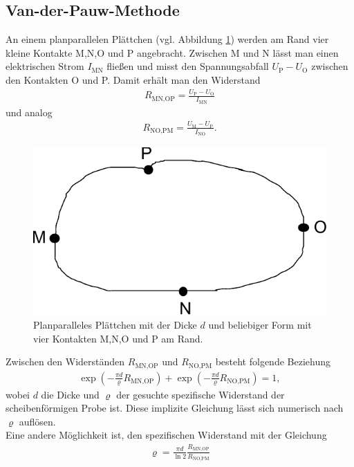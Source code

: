 \documentclass[a4paper,12pt]{article}
\begin{document}
\subsection{Van-der-Pauw-Methode}
An einem planparallelen Plättchen (vgl. Abbildung \ref{fig:vdP}) werden am Rand vier kleine Kontakte M,N,O und P angebracht. Zwischen M und N lässt man einen elektrischen Strom $I_\text{MN}$ fließen und misst den Spannungsabfall $U_\text{P}-U_\text{O}$ zwischen den Kontakten O und P. Damit erhält man den Widerstand
\begin{align}
R_\text{MN,OP}=\frac{U_\text{P}-U_\text{O}}{I_\text{MN}}
\end{align}
und analog
\begin{align}
R_\text{NO,PM}=\frac{U_\text{M}-U_\text{P}}{I_\text{NO}}.
\end{align}
\begin{figure}[h]
\centering
\includegraphics[scale=1]{arbitrary_plate.pdf}
\caption{Planparalleles Plättchen mit der Dicke $d$ und beliebiger Form mit vier Kontakten M,N,O und P am Rand.}
\label{fig:vdP}
\end{figure}
Zwischen den Widerständen $R_\text{MN,OP}$ und $R_\text{NO,PM}$ besteht folgende Beziehung
\begin{align}
\exp\left(-\frac{\pi d}{\varrho}R_\text{MN,OP}\right)+\exp\left(-\frac{\pi d}{\varrho}R_\text{NO,PM}\right)=1,
\end{align}
wobei $d$ die Dicke und $\varrho$ der gesuchte spezifische Widerstand der scheibenförmigen Probe ist. Diese implizite Gleichung lässt sich numerisch nach $\varrho$ auflösen.\\
Eine andere Möglichkeit ist, den spezifischen Widerstand mit der Gleichung 
\begin{align}
\varrho=\frac{\pi d}{\ln 2}\frac{R_\text{MN,OP}}{R_\text{NO,PM}}
\end{align}
\end{document}
